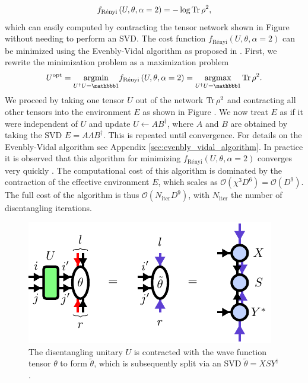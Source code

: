 \begin{equation}
	\label{eq:renyi_entropy_alpha_2}
	f_\text{Rényi}\left(U,\theta,\alpha=2\right) = -\log\operatorname{Tr}\rho^2,
\end{equation}
which can easily computed by contracting the tensor network shown in Figure  without needing to perform an SVD. The cost function $f_\text{Rényi}\left(U,\theta,\alpha=2\right)$ can be minimized using the Evenbly-Vidal algorithm as proposed in \cite{cite:finding_purifications_with_minimal_entanglement}. First, we rewrite the minimization problem as a maximization problem
\begin{equation}
	U^\text{opt} = \underset{U^\dagger U = \id}{\argmin} f_\text{Rényi}\left(U,\theta,\alpha=2\right) = \underset{U^\dagger U = \id}{\argmax}\Tr\rho^2.
\end{equation}
We proceed by taking one tensor $U$ out of the network $\operatorname{Tr}\rho^2$ and contracting all other tensors into the environment $E$ as shown in Figure . We now treat $E$ as if it were independent of $U$ and update $U\leftarrow AB^\dagger$, where $A$ and $B$ are obtained by taking the SVD $E=A\Lambda B^\dagger$. This is repeated until convergence. For details on the Evenbly-Vidal algorithm see Appendix \ref{sec:evenbly_vidal_algorithm}. In practice it is observed that this algorithm for minimizing $f_\text{Rényi}\left(U,\theta,\alpha=2\right)$ converges very quickly \cite{cite:efficient_simulation_of_dynamics_in_two_dimensional_quantum_spin_systems}. The computational cost of this algorithm is dominated by the contraction of the effective environment $E$, which scales as $\mathcal{O}(\chi^3D^6) = \mathcal{O}(D^9)$. The full cost of the algorithm is thus $\mathcal{O}(N_\text{iter}D^9)$, with $N_\text{iter}$ the number of disentangling iterations.\par
\begin{figure}
	\centering
	\includegraphics[scale=1]{figures/tikz/disoTPS/theta_tilde_contraction/theta_tilde_contraction.pdf}
	\caption{The disentangling unitary $U$ is contracted with the wave function tensor $\theta$ to form $\tilde{\theta}$, which is subsequently split via an SVD $\tilde{\theta} = XSY^\dagger$.}
	\label{fig:disentangling_theta_definition}
\end{figure}
